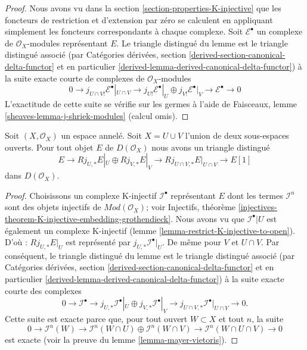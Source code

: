 \begin{proof}

Nous avons vu dans la section \ref{section-properties-K-injective}
que les foncteurs de restriction et d'extension par zéro se calculent en appliquant simplement les foncteurs correspondants à chaque complexe. Soit $\mathcal{E}^\bullet$ un complexe de $\mathcal{O}_X$-modules représentant $E$. Le triangle distingué du lemme est le triangle distingué associé (par Catégories dérivées, section
\ref{derived-section-canonical-delta-functor} et en particulier \ref{derived-lemma-derived-canonical-delta-functor}) à la suite exacte courte de complexes de $\mathcal{O}_X$-modules
$$
0 \to j_{U \cap V!}\mathcal{E}^\bullet|_{U \cap V} \to
j_{U!}\mathcal{E}^\bullet|_U \oplus j_{V!}\mathcal{E}^\bullet|_V
\to \mathcal{E}^\bullet \to 0
$$
L'exactitude de cette suite se vérifie sur les germes à l'aide de Faisceaux, lemme \ref{sheaves-lemma-j-shriek-modules}
(calcul omis).

\end{proof}

\begin{lemma}

\label{lemma-exact-sequence-j-star}
Soit $(X, \mathcal{O}_X)$ un espace annelé. Soit $X = U \cup V$ l'union de deux sous-espaces ouverts. Pour tout objet $E$ de $D(\mathcal{O}_X)$ nous avons un triangle distingué $$
E \to 
Rj_{U, *}E|_U \oplus Rj_{V, *}E|_V \to
Rj_{U \cap V, *}E|_{U \cap V} \to
E[1]
$$ dans $D(\mathcal{O}_X)$.
\end{lemma}

\begin{proof}

Choisissons un complexe K-injectif $\mathcal{I}^\bullet$ représentant $E$
dont les termes $\mathcal{I}^n$ sont des objets injectifs de
$\textit{Mod}(\mathcal{O}_X)$; voir Injectifs, théorème
\ref{injectives-theorem-K-injective-embedding-grothendieck}. Nous avons vu que $\mathcal{I}^\bullet|U$ est également un complexe K-injectif (lemme \ref{lemma-restrict-K-injective-to-open}). D'où :
$Rj_{U, *}E|_U$ est représenté par $j_{U, *}\mathcal{I}^\bullet|_U$. De même pour $V$ et $U \cap V$. Par conséquent, le triangle distingué du lemme est le triangle distingué associé (par Catégories dérivées, section
\ref{derived-section-canonical-delta-functor} et en particulier \ref{derived-lemma-derived-canonical-delta-functor}) à la suite exacte courte des complexes
$$
0 \to
\mathcal{I}^\bullet \to
j_{U, *}\mathcal{I}^\bullet|_U \oplus j_{V, *}\mathcal{I}^\bullet|_V \to
j_{U \cap V, *}\mathcal{I}^\bullet|_{U \cap V} \to
0.
$$
Cette suite est exacte parce que, pour tout ouvert $W \subset X$ et tout $n$, la suite
$$
0 \to
\mathcal{I}^n(W) \to
\mathcal{I}^n(W \cap U) \oplus \mathcal{I}^n(W \cap V) \to
\mathcal{I}^n(W \cap U \cap V) \to
0
$$
est exacte (voir la preuve du lemme \ref{lemma-mayer-vietoris}).

\end{proof}

